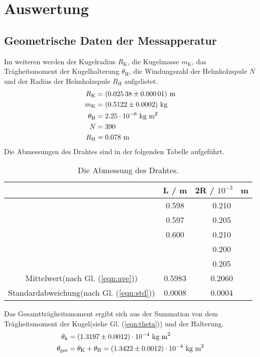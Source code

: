 \section{Auswertung}
\label{sec:Auswertung}

\subsection{Geometrische Daten der Messapperatur}
Im weiteren werden der Kugelradius $R_\text{K}$, die Kugelmasse $m_\text{K}$, das Trägheitsmoment der Kugelhalterung $\theta_\text{H}$, die Windungszahl der Helmholzspule $N$ und der Radius der Helmholzspule $R_\text{H}$ aufgelistet.
\begin{align*}
  R_\text{K} &= (\num{0.02538 +- 0.00001}) \ \text{m} \\
  m_\text{K} &= (\num{0.5122 +- 0.0002}) \ \text{kg} \\
  \theta_\text{H} &= 2.25 \cdot 10^{-6} \ \text{kg m}^2 \\
  N &= 390 \\
  R_\text{H} &= 0.078 \ \text{m}
\end{align*}
Die Abmessungen des Drahtes sind in der folgenden Tabelle aufgeführt.

\begin{table}[H] %
  \centering
  \begin{tabular}{c | c | c}
    \toprule
    & L / m & 2R / $10^{-3}$ \ m \\
    \midrule
    & 0.598 & 0.210 \\
    & 0.597 & 0.205 \\
    & 0.600 & 0.210 \\
    &       & 0.200 \\
    &       & 0.205 \\
    \bottomrule
    Mittelwert(nach Gl. (\ref{eqn:ave}))         & 0.5983 & 0.2060 \\
    Standardabweichung(nach Gl. (\ref{eqn:std})) & 0.0008 & 0.0004 \\
    \bottomrule
  \end{tabular}
  \caption{Die Abmessung des Drahtes.}
  \label{tab:Messwerte}
\end{table}

Das Gesamtträgheitsmoment ergibt sich aus der Summation von dem Trägheitsmoment der Kugel(siehe Gl. (\ref{eqn:theta})) und der Halterung.
\begin{align*}
  \theta_\text{k} & = (\num{1.3197 +- 0.0012}) \cdot 10^{-4} \ \text{kg m}^2 \\
  \theta_\text{ges} & = \theta_\text{K} + \theta_\text{H} = (\num{1.3422 +- 0.0012}) \cdot 10^{-4} \ \text{kg m}^2
\end{align*}

